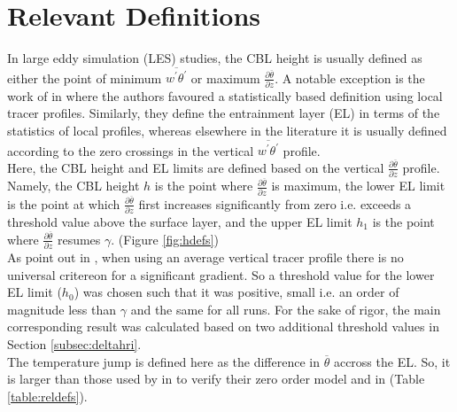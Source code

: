 \clearpage

\section{Relevant Definitions}
\FloatBarrier
In large eddy simulation (\acs{LES}) studies, the \acs{CBL} height is usually defined as either the point of minimum 
$\overline{w^{'} \theta^{'}}$ or maximum $\frac{\partial \overline{\theta}}{\partial z}$.
A notable exception is the work of \citeauthor{BrooksFowler2} in \cite{BrooksFowler2} 
where the authors favoured a statistically based definition using local tracer profiles.  Similarly, they define the 
entrainment layer (\acs{EL}) in terms of the statistics of local profiles, 
whereas elsewhere in the literature it is usually defined according to the zero crossings in 
the vertical $\overline{w^{'} \theta^{'}}$ profile.\\

Here, the \acs{CBL} height and \acs{EL} limits are defined based on the vertical  $\frac{\partial \overline{\theta}}{\partial z}$
profile.  Namely, the \acs{CBL} height $h$ is the point where  $\frac{\partial \overline{\theta}}{\partial z}$ is maximum, the 
lower \acs{EL} limit is the point at which  $\frac{\partial \overline{\theta}}{\partial z}$ first increases
significantly from zero i.e. exceeds a threshold value above the surface layer, and the upper \acs{EL} limit $h_{1}$ is the point where
$\frac{\partial \overline{\theta}}{\partial z}$ resumes $\gamma$. (Figure \ref{fig:hdefs})\\

As \citeauthor{BrooksFowler2} point out in \cite{BrooksFowler2}, when using an average vertical 
tracer profile there is no universal critereon for a significant gradient.  So a threshold value for the
lower \acs{EL} limit ($h_{0}$) was chosen such that it was positive, small i.e. an order of magnitude 
less than $\gamma$ and the same for all runs.  For the sake of rigor, the main corresponding result 
was calculated based on two additional threshold values in Section \ref{subsec:deltahri}.\\

The temperature jump is defined here as the difference in $\overline{\theta}$ accross the \acs{EL}.
So, it is larger than those used by  \citeauthor{FedConzMir04} in \cite{FedConzMir04} to verify 
their zero order model and \citeauthor{SullMoengStev} in \cite{SullMoengStev} (Table \ref{table:reldefs}).\\ 
 
